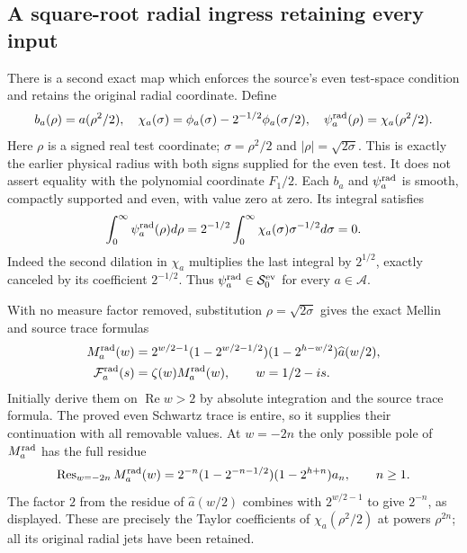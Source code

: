 \subsection{A square-root radial ingress retaining every input}

There is a second exact map which enforces the source's even
test-space condition and retains the original radial coordinate.
Define
\[
 b_a(\rho)=a(\rho^2/2),\quad
 \chi_a(\sigma)=\phi_a(\sigma)-2^{-1/2}\phi_a(\sigma/2),\quad
 \psi_a^{\rm rad}(\rho)=\chi_a(\rho^2/2).
\]
Here $\rho$ is a signed real test coordinate; $\sigma=\rho^2/2$
and $|\rho|=\sqrt{2\sigma}$. This is exactly the earlier physical
radius with both signs supplied for the even test. It does not
assert equality with the polynomial coordinate $F_1/2$.
Each $b_a$ and $\psi_a^{\rm rad}$ is smooth, compactly supported
and even, with value zero at zero. Its integral satisfies
\[
 \int_0^\infty\psi_a^{\rm rad}(\rho)d\rho
 =2^{-1/2}\int_0^\infty\chi_a(\sigma)\sigma^{-1/2}d\sigma=0.
\]
Indeed the second dilation in $\chi_a$ multiplies the last integral
by $2^{1/2}$, exactly canceled by its coefficient $2^{-1/2}$.
Thus $\psi_a^{\rm rad}\in\mathcal S_0^{\rm ev}$ for every
$a\in\mathscr A$.

With no measure factor removed, substitution $\rho=\sqrt{2\sigma}$
gives the exact Mellin and source trace formulas
\begin{align}
 M_a^{\rm rad}(w)
 &=2^{w/2-1}(1-2^{w/2-1/2})(1-2^{h-w/2})
                    \widehat a(w/2),\notag\\
 \mathcal F_a^{\rm rad}(s)
 &=\zeta(w)M_a^{\rm rad}(w),\qquad w=1/2-is.
 \label{eq:cq-angular-radial-source-map}
\end{align}
Initially derive them on $\operatorname{Re}w>2$ by absolute
integration and the source trace formula. The proved even
Schwartz trace is entire, so it supplies their continuation
with all removable values. At $w=-2n$ the only possible pole of
$M_a^{\rm rad}$ has the full residue
\begin{equation}
 \operatorname{Res}_{w=-2n}M_a^{\rm rad}(w)
 =2^{-n}(1-2^{-n-1/2})(1-2^{h+n})a_n,\qquad n\geq1 .
 \label{eq:cq-angular-radial-Taylor-data}
\end{equation}
The factor $2$ from the residue of $\widehat a(w/2)$ combines
with $2^{w/2-1}$ to give $2^{-n}$, as displayed.
These are precisely the Taylor coefficients of
$\chi_a(\rho^2/2)$ at powers $\rho^{2n}$; all its original
radial jets have been retained.

